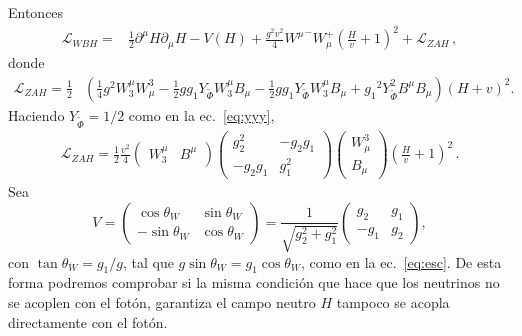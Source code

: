 \begin{frame}

Entonces
\begin{align}
  \label{eq:96qft}
  \mathcal{L}_{WBH}=&\frac{1}{2}\partial^\mu H\partial_\mu H-V(H)
  +\frac{g^2v^2}{4}{W^\mu}^-W_\mu^+ \left( \frac{H}{v}+1 \right)^2+\mathcal{L}_{Z A H}\,,
\end{align}
donde
\begin{align}
  \mathcal{L}_{ZAH}=\frac{1}{2}&\left(\tfrac{1}{4}g^2W_3^\mu W^3_\mu-\tfrac{1}{2}g{g_1}Y_{\widetilde{\Phi}} W_3^\mu B_\mu-\tfrac{1}{2}g{g_1}Y_{\widetilde{\Phi}} W_3^\mu B_\mu+{{g_1}}^2Y_{\widetilde{\Phi}} ^2B^\mu B_\mu\right)
\left(H+v\right)^2.
\end{align}
Haciendo $Y_{\widetilde{\Phi}} =1/2$ como en la ec.~\eqref{eq:yyy},
\begin{align}
  \mathcal{L}_{ZAH}=\frac{1}{2}\frac{v^2}{4}
  \begin{pmatrix}
    W^\mu_3 & B^\mu
  \end{pmatrix}
  \begin{pmatrix}
    g^2_2&-g_2{g_1}\\
    -g_2{g_1}&g_1^2
  \end{pmatrix}
  \begin{pmatrix}
    W^3_\mu\\
    B_\mu
  \end{pmatrix}
\left(\frac{H}{v}+1\right)^2\,.
\end{align}
Sea
\begin{equation}
  V=\begin{pmatrix}
    \cos\theta_W & \sin\theta_W\\
    -\sin\theta_W& \cos\theta_W
  \end{pmatrix}=
  \frac{1}{\sqrt{g^2_2+g_1^2}}\begin{pmatrix}
    g_2   & {g_1}\\
    -{g_1} & g_2
  \end{pmatrix},
\end{equation}
con $\tan\theta_W={g_1}/g$, tal que $g\sin\theta_W={g_1}\cos\theta_W$, como en la ec.~\eqref{eq:esc}. De esta forma podremos comprobar si la misma condición que hace que los neutrinos no se acoplen con el fotón, garantiza el campo neutro $H$ tampoco se acopla directamente con el fotón. 


\end{frame}
